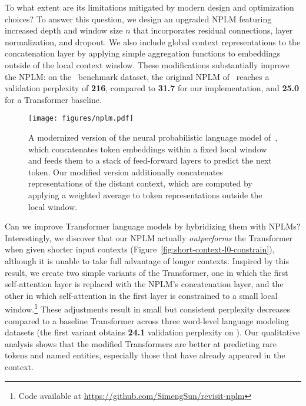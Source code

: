 \documentclass[11pt]{article}
\begin{document}
To what extent are its limitations mitigated by modern design and optimization choices?
To answer this question,  we design an upgraded NPLM featuring increased depth and window size $n$ that incorporates residual connections, layer normalization, and dropout. We also include global context representations  to the concatenation layer by applying simple aggregation functions to embeddings outside of the local context window. These modifications substantially improve the NPLM: on the \wtthree\ benchmark dataset, the original NPLM of~\citet{Bengio2003ANP} reaches a validation perplexity of \textbf{216}, compared to \textbf{31.7} for our implementation, and \textbf{25.0} for a Transformer baseline.  

\begin{figure}[t]
    \texttt{[image: figures/nplm.pdf]}
    \caption{A modernized version of the neural probabilistic language model of~\citet{Bengio2003ANP}, which concatenates token embeddings within a fixed local window and feeds them to a stack of feed-forward layers to predict the next token. Our modified version additionally concatenates representations of the  distant context, which are computed by applying a weighted average to token representations outside the local window.}
    \label{fig:nplm}
\end{figure}

Can we improve Transformer language models by hybridizing them with NPLMs? Interestingly, we discover that our NPLM actually \emph{outperforms} the Transformer when given shorter input contexts (Figure~\ref{fig:short-context-l0-constrain}), although it is unable to take full advantage of longer contexts. Inspired by this result, we create two simple variants of the Transformer, one in which the first self-attention layer is replaced with the NPLM's concatenation layer, and the other in which self-attention in the first layer is constrained to a small local window.\footnote{Code available at \url{https://github.com/SimengSun/revisit-nplm}} These adjustments result in small but consistent perplexity decreases compared to a baseline Transformer across three word-level language modeling datasets (the first variant obtains \textbf{24.1} validation perplexity on \wtthree). Our qualitative analysis shows that the modified Transformers are better at predicting rare tokens and named entities, especially those that have already appeared in the context. 
\end{document}
